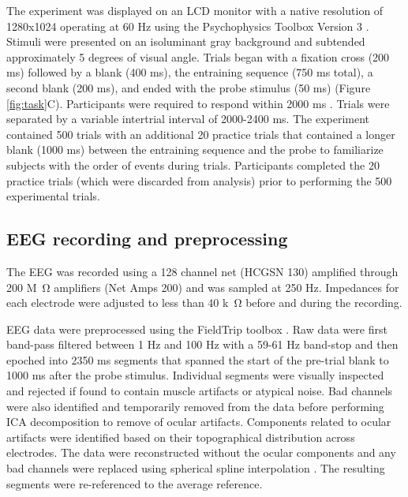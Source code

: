\documentclass[defaultstyle,12pt]{article}
\begin{document}
The experiment was displayed on an LCD monitor with a native resolution of 1280x1024 operating at 60 Hz using the Psychophysics Toolbox Version 3 \cite{Brainard97,Pelli97}. Stimuli were presented on an isoluminant gray background and subtended approximately 5 degrees of visual angle. Trials began with a fixation cross (200 ms) followed by a blank (400 ms), the entraining sequence (750 ms total), a second blank (200 ms), and ended with the probe stimulus (50 ms) (Figure \ref{fig:task}C). Participants were required to respond within 2000 ms . Trials were separated by a variable intertrial interval of 2000-2400 ms. The experiment contained 500 trials with an additional 20 practice trials that contained a longer blank (1000 ms) between the entraining sequence and the probe to familiarize subjects with the order of events during trials. Participants completed the 20 practice trials (which were discarded from analysis) prior to performing the 500 experimental trials. %

\subsection{EEG recording and preprocessing}
The EEG was recorded using a 128 channel net (HCGSN 130) amplified through 200 M\SI{}{\ohm} amplifiers (Net Amps 200) and was sampled at 250 Hz. Impedances for each electrode were adjusted to less than 40 k\SI{}{\ohm} before and during the recording.


EEG data were preprocessed using the FieldTrip toolbox \cite{OostenveldFriesMarisEtAl11}. Raw data were first band-pass filtered between 1 Hz and 100 Hz with a 59-61 Hz band-stop and then epoched into 2350 ms segments that spanned the start of the pre-trial blank to 1000 ms after the probe stimulus. Individual segments were visually inspected and rejected if found to contain muscle artifacts or atypical noise. Bad channels were also identified and temporarily removed from the data before performing ICA decomposition \cite{DelormeMakeig04} to remove of ocular artifacts. Components related to ocular artifacts were identified based on their topographical distribution across electrodes. The data were reconstructed without the ocular components and any bad channels were replaced using spherical spline interpolation \cite{PerrinPernierBertrandEtAl89}. The resulting segments were re-referenced to the average reference.
\end{document}
